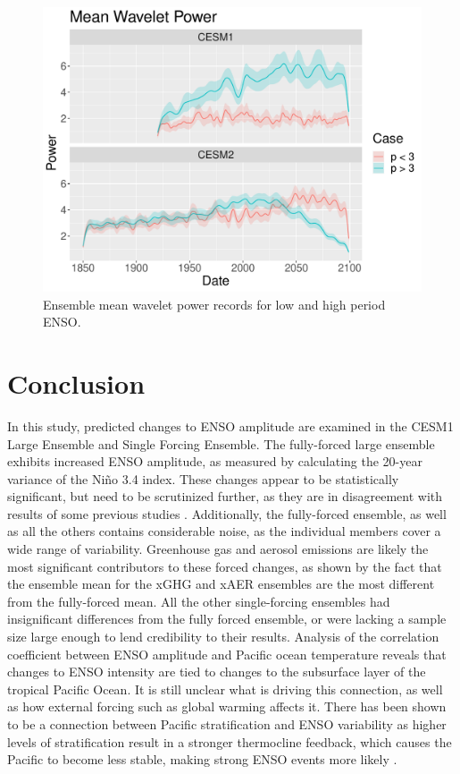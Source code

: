 \documentclass[11pt]{article}
\begin{document}
\begin{figure}
\centering
\includegraphics[width=.5\linewidth]{../../data/figures/wavelet3.pdf}
\caption{\label{fig:wavelet_2}Ensemble mean wavelet power records for low and high period ENSO.}
\end{figure}

\section{Conclusion}

In this study, predicted changes to ENSO amplitude are examined in the CESM1 Large Ensemble and Single Forcing Ensemble. The fully-forced large ensemble exhibits increased ENSO amplitude, as measured by calculating the 20-year variance of the Niño 3.4 index. These changes appear to be statistically significant, but need to be scrutinized further, as they are in disagreement with results of some previous studies \citep{stevenson2012significant}. Additionally, the fully-forced ensemble, as well as all the others contains considerable noise, as the individual members cover a wide range of variability. Greenhouse gas and aerosol emissions are likely the most significant contributors to these forced changes, as shown by the fact that the ensemble mean for the xGHG and xAER ensembles are the most different from the fully-forced mean. All the other single-forcing ensembles had insignificant differences from the fully forced ensemble, or were lacking a sample size large enough to lend credibility to their results. Analysis of the correlation coefficient between ENSO amplitude and Pacific ocean temperature reveals that changes to ENSO intensity are tied to changes to the subsurface layer of the tropical Pacific Ocean. It is still unclear what is driving this connection, as well as how external forcing such as global warming affects it. There has been shown to be a connection between Pacific stratification and ENSO variability as higher levels of stratification result in a stronger thermocline feedback, which causes the Pacific to become less stable, making strong ENSO events more likely \citep{dewitte2012reinterpreting}.
\end{document}
